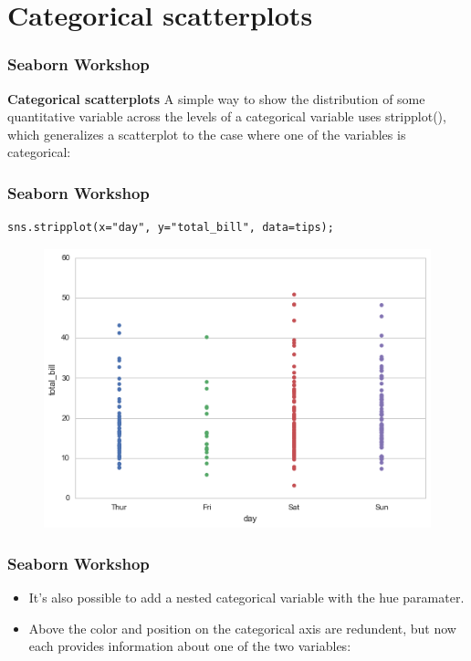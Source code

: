 \documentclass{beamer}
\begin{document}
\section{Categorical scatterplots}
\begin{frame}[fragile]
\frametitle{Seaborn Workshop}
\large
\noindent \textbf{Categorical scatterplots}
A simple way to show the distribution of some quantitative variable across the levels of a categorical variable uses stripplot(), which generalizes a scatterplot to the case where one of the variables is categorical:
\end{frame}
\begin{frame}[fragile]
	\frametitle{Seaborn Workshop}
	\large
\begin{verbatim}
sns.stripplot(x="day", y="total_bill", data=tips);
\end{verbatim}

\begin{figure}
	\centering
	\includegraphics[width=0.7\linewidth]{images/categorical_9_0}
\end{figure}
\end{frame}
\begin{frame}[fragile]
\frametitle{Seaborn Workshop}
\large
\begin{itemize}
\item It’s also possible to add a nested categorical variable with the hue paramater. 
\item Above the color and position on the categorical axis are redundent, but now each provides information about one of the two variables:
\end{itemize}

\end{frame}
\end{document}
